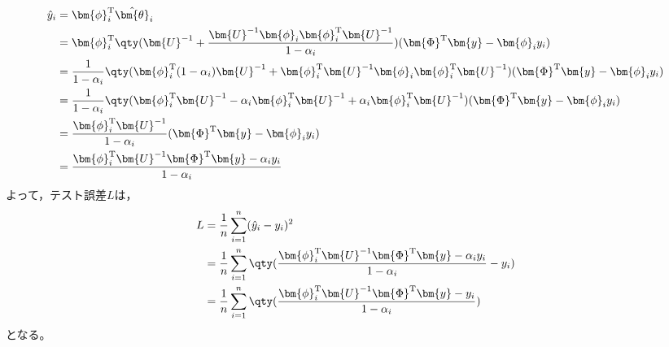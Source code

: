 \documentclass[class=jsarticle, crop=false, dvipdfmx, fleqn]{standalone}
\begin{document}
\begin{align}
    \hat{y}_i
        & = \bm{\phi}_i^\mathrm{T} \hat{\bm{\theta}}_i \\
        & = \bm{\phi}_i^\mathrm{T} \qty(\bm{U}^{-1} + \frac{\bm{U}^{-1} \bm{\phi}_i \bm{\phi}_i^\mathrm{T} \bm{U}^{-1}}{1 - \alpha_i}) (\bm{\Phi}^\mathrm{T} \bm{y} - \bm{\phi}_i y_i) \\
        & = \frac{1}{1 - \alpha_i} \qty( \bm{\phi}_i^\mathrm{T} (1 - \alpha_i) \bm{U}^{-1} + \bm{\phi}_i^\mathrm{T} \bm{U}^{-1} \bm{\phi}_i \bm{\phi}_i^\mathrm{T} \bm{U}^{-1} ) (\bm{\Phi}^\mathrm{T} \bm{y} - \bm{\phi}_i y_i) \\
        & = \frac{1}{1 - \alpha_i} \qty( \bm{\phi}_i^\mathrm{T} \bm{U}^{-1} - \alpha_i \bm{\phi}_i^\mathrm{T} \bm{U}^{-1} + \alpha_i \bm{\phi}_i^\mathrm{T} \bm{U}^{-1} ) (\bm{\Phi}^\mathrm{T} \bm{y} - \bm{\phi}_i y_i) \\
        & = \frac{\bm{\phi}_i^\mathrm{T} \bm{U}^{-1}}{1 - \alpha_i} (\bm{\Phi}^\mathrm{T} \bm{y} - \bm{\phi}_i y_i) \\
        & = \frac{\bm{\phi}_i^\mathrm{T} \bm{U}^{-1} \bm{\Phi}^\mathrm{T} \bm{y} - \alpha_i y_i}{1 - \alpha_i}
\end{align}
よって，テスト誤差\(L\)は，
\begin{align}
    L
        & = \frac{1}{n} \sum_{i=1}^n (\hat{y}_i - y_i)^2 \\
        & = \frac{1}{n} \sum_{i=1}^n \qty(\frac{\bm{\phi}_i^\mathrm{T} \bm{U}^{-1} \bm{\Phi}^\mathrm{T} \bm{y} - \alpha_i y_i}{1 - \alpha_i} - y_i) \\
        & = \frac{1}{n} \sum_{i=1}^n \qty(\frac{\bm{\phi}_i^\mathrm{T} \bm{U}^{-1} \bm{\Phi}^\mathrm{T} \bm{y} - y_i}{1 - \alpha_i})
\end{align}
となる。
\end{document}
